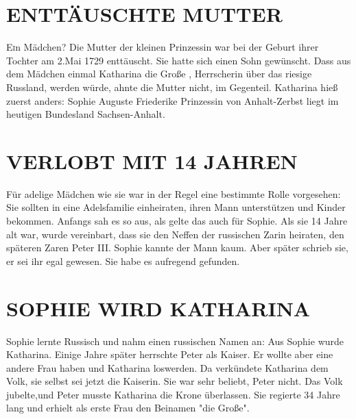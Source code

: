 \documentclass[twoside]{article}
\begin{document}
\begin{multicols}{2} %

\section{ENTT\"AUSCHTE MUTTER}

\lettrine[nindent=0em,lines=3]{E}in M\"adchen? Die Mutter der kleinen Prinzessin war bei der
 Geburt ihrer Tochter am 2.Mai 1729 entt\"auscht. Sie hatte sich einen Sohn gew\"unscht. Dass
 aus dem M\"adchen einmal Katharina die Gro{\ss}e , Herrscherin \"uber das riesige Russland,
 werden w\"urde, ahnte die Mutter nicht, im Gegenteil. Katharina hie{\ss} zuerst anders:
 Sophie Auguste Friederike Prinzessin von Anhalt-Zerbst liegt im heutigen Bundesland Sachsen-Anhalt.

\section{VERLOBT MIT 14 JAHREN}

F\"ur adelige M\"adchen wie sie war in der Regel eine bestimmte Rolle vorgesehen: Sie sollten
 in eine Adelsfamilie einheiraten, ihren Mann unterst\"utzen und Kinder bekommen. Anfangs
 sah es so aus, als gelte das auch f\"ur Sophie. Als sie 14 Jahre alt war, wurde vereinbart,
 dass sie den Neffen der russischen Zarin heiraten, den sp\"ateren Zaren Peter III. Sophie
 kannte der Mann kaum. Aber sp\"ater schrieb sie, er sei ihr egal gewesen. Sie habe es
 aufregend gefunden.

\section{SOPHIE WIRD KATHARINA}

Sophie lernte Russisch und nahm einen russischen Namen an:
 Aus Sophie wurde Katharina. Einige Jahre sp\"ater herrschte
 Peter als Kaiser. Er wollte aber eine andere Frau haben
 und Katharina loswerden. Da verk\"undete Katharina dem Volk,
 sie selbst sei jetzt die Kaiserin. Sie war sehr beliebt,
 Peter nicht. Das Volk jubelte,und Peter musste Katharina die
 Krone \"uberlassen. Sie regierte 34 Jahre lang und erhielt
 als erste Frau den Beinamen "die Gro{\ss}e".


\end{multicols}
\end{document}
